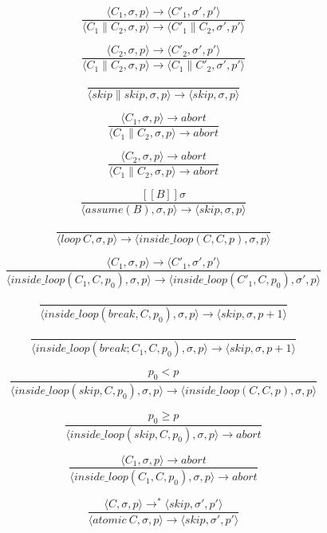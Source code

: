 \documentclass{article}
\begin{document}
\[
\tag{\sc Par1}
\frac{\langle C_1, \sigma, p \rangle \to \langle C'_1, \sigma', p' \rangle}
{\langle C_1 \parallel C_2, \sigma, p \rangle \to \langle C'_1 \parallel C_2, \sigma', p' \rangle}
\]

\[
\tag{\sc Par2}
\frac{\langle C_2, \sigma, p \rangle \to \langle C'_2, \sigma', p' \rangle}
{\langle C_1 \parallel C_2, \sigma, p \rangle \to \langle C_1 \parallel C'_2, \sigma', p' \rangle}
\]

\[
\tag{\sc Par3}
\frac{}
{\langle skip \parallel skip, \sigma, p \rangle \to \langle skip, \sigma, p \rangle}
\]

\[
\tag{\sc ParAbort1}
\frac{\langle C_1, \sigma, p \rangle \to abort}
{\langle C_1 \parallel C_2, \sigma, p \rangle \to abort}
\]

\[
\tag{\sc ParAbort2}
\frac{\langle C_2, \sigma, p \rangle \to abort}
{\langle C_1 \parallel C_2, \sigma, p \rangle \to abort}
\]

\[
\tag{\sc Assume}
\frac{[\![B]\!]\sigma}
{\langle assume(B), \sigma, p \rangle \to \langle skip, \sigma, p \rangle}
\]

\[
\tag{\sc LoopEnter}
\frac{}
{\langle loop \  C, \sigma, p \rangle \to \langle inside\_loop(C, C, p), \sigma, p \rangle}
\]

\[
\tag{\sc LoopSeq}
\frac{\langle C_1, \sigma, p \rangle \to \langle C'_1, \sigma', p' \rangle}
{\langle inside\_loop(C_1, C, p_0), \sigma, p \rangle \to \langle inside\_loop(C'_1, C, p_0), \sigma', p \rangle}
\]

\[
\tag{\sc LoopBreak1}
\frac{}
{\langle inside\_loop(break, C, p_0), \sigma, p \rangle \to \langle skip, \sigma, p + 1 \rangle}
\]

\[
\tag{\sc LoopBreak2}
\frac{}
{\langle inside\_loop(break; C_1, C, p_0), \sigma, p \rangle \to \langle skip, \sigma, p + 1 \rangle}
\]


\[
\tag{\sc LoopAssert1}
\frac{p_0 < p}
{\langle inside\_loop(skip, C, p_0), \sigma, p \rangle \to \langle inside\_loop(C, C, p), \sigma, p \rangle }
\]

\[
\tag{\sc LoopAssert2}
\frac{p_0 \geq p}
{\langle inside\_loop(skip, C, p_0), \sigma, p \rangle \to abort}
\]

\[
\tag{\sc LoopAbort}
\frac{\langle C_1, \sigma, p \rangle \to abort}
{\langle inside\_loop(C_1, C, p_0), \sigma, p \rangle \to abort}
\]

\[
\tag{\sc Atom}
\frac{\langle C, \sigma, p \rangle \to^* \langle skip, \sigma', p' \rangle}
{\langle atomic \  C, \sigma, p \rangle \to \langle skip, \sigma', p' \rangle}
\]
\end{document}
